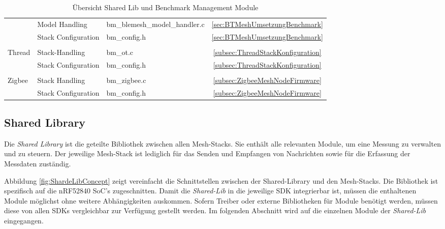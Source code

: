 \begin{table}[h]
\begin{tabular}{|l|l|l|c|}
\cline{2-4}
& Model Handling & bm\_blemesh\_model\_handler.c & \ref{sec:BTMeshUmsetzungBenchmark} \\ 
\cline{2-4}
 & Stack Configuration & bm\_config.h & \ref{sec:BTMeshUmsetzungBenchmark} \\ 
\hline
\multicolumn{1}{l}{} & \multicolumn{1}{l}{} & \multicolumn{1}{l}{} & \multicolumn{1}{l}{} \\ 
\hline
\multirow{2}{*}{Thread} & Stack-Handling & bm\_ot.c & \ref{subsec:ThreadStackKonfiguration} \\ 
\cline{2-4}
 & Stack Configuration & bm\_config.h & \ref{subsec:ThreadStackKonfiguration} \\ 
\hline
\multicolumn{1}{l}{} & \multicolumn{1}{l}{} & \multicolumn{1}{l}{} & \multicolumn{1}{l}{} \\ 
\hline
\multirow{2}{*}{Zigbee} & Stack Handling & bm\_zigbee.c & \ref{subsec:ZigbeeMeshNodeFirmware} \\ 
\cline{2-4}
 & Stack Configuration & bm\_config.h & \ref{subsec:ZigbeeMeshNodeFirmware} \\
\hline
\end{tabular}
\caption{Übersicht Shared Lib und Benchmark Management Module}
\label{tab:UebersichtSoftware}
\end{table}



\subsection{Shared Library}\label{subsec:SharedLibrary}

Die \textit{Shared Library} ist die geteilte Bibliothek zwischen allen Mesh-Stacks. Sie enthält alle relevanten Module, um eine Messung zu verwalten und zu steuern. Der jeweilige Mesh-Stack ist lediglich für das Senden und Empfangen von Nachrichten sowie für die Erfassung der Messdaten zuständig. 

Abbildung \ref{fig:ShardeLibConcept} zeigt vereinfacht die Schnittstellen zwischen der Shared-Library und den Mesh-Stacks.
Die Bibliothek ist spezifisch auf die nRF52840 SoC's zugeschnitten.
Damit die \textit{Shared-Lib} in die jeweilige SDK integrierbar ist, müssen die enthaltenen Module möglichst ohne weitere Abhängigkeiten auskommen.
Sofern Treiber oder externe Bibliotheken für Module benötigt werden, müssen diese von allen SDKs vergleichbar zur Verfügung gestellt werden.
Im folgenden Abschnitt wird auf die einzelnen Module der \textit{Shared-Lib} eingegangen. 

